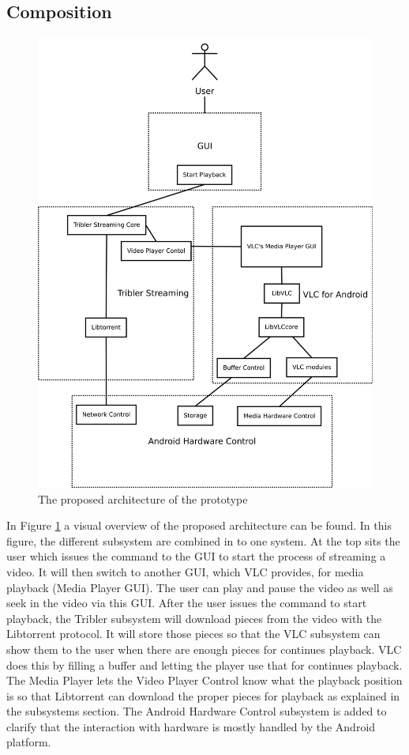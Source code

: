 \subsection{Composition}
\label{sec:comp}
\begin{figure}[h!]
	\includegraphics[width=\textwidth]{contents/ad/images/proposed_architecture.png}
	\caption{The proposed architecture of the prototype}
	\label{fig:prop_arch}
\end{figure}
In Figure \ref{fig:prop_arch} a visual overview of the proposed architecture can be found. In this figure, the different subsystem are combined in to one system. At the top sits the user which issues the command to the GUI to start the process of streaming a video. It will then switch to another GUI, which VLC provides, for media playback (Media Player GUI). The user can play and pause the video as well as seek in the video via this GUI. After the user issues the command to start playback, the Tribler subsystem will download pieces from the video with the Libtorrent protocol. It will store those pieces so that the VLC subsystem can show them to the user when there are enough pieces for continues playback. VLC does this by filling a buffer and letting the player use that for continues playback. The Media Player lets the Video Player Control know what the playback position is so that Libtorrent can download the proper pieces for playback as explained in the subsystems section. The Android Hardware Control subsystem is added to clarify that the interaction with hardware is mostly handled by the Android platform.